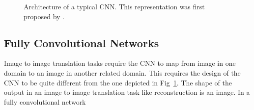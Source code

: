 \begin{figure}[t!]
	\caption{Architecture of a typical \ac{CNN}. This representation was first proposed by \cite{lecun1995convolutional}.}
	\label{fig:trad_cnn}
\end{figure}

\subsection{Fully Convolutional Networks}

Image to image translation tasks require the \ac{CNN} to map from image in one domain to an image in another related domain. This requires the design of the \ac{CNN} to be quite different from the one depicted in Fig~\ref{fig:trad_cnn}. The shape of the output in an image to image translation task like reconstruction is an image. In a fully convolutional network 
